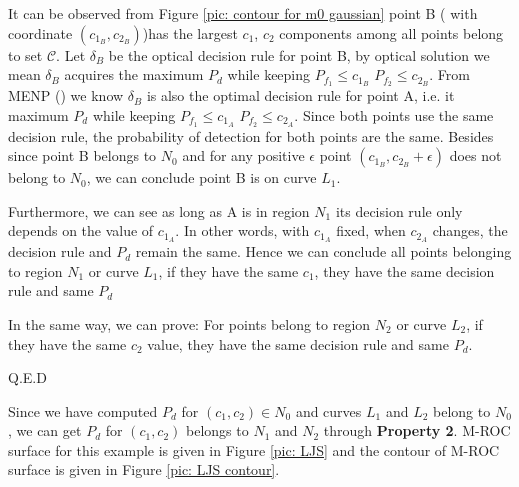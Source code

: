 It can be observed from Figure \ref{pic: contour for m0 gaussian} point B ( with coordinate $(c_{1_B}, c_{2_B})$)has the largest $c_1$, $c_2$ components among all points belong to set $\mathcal{C}$. 
Let $\delta_B$ be the optical decision rule for point B, by optical solution we mean $\delta_B$ acquires the maximum $P_d$ while keeping $P_{f_1} \leq c_{1_B}$ $P_{f_2} \leq c_{2_B}$.
From MENP () we know  $\delta_B$ is also the optimal decision rule for point A, i.e. it maximum $P_d$ while keeping $P_{f_1} \leq c_{1_A}$ $P_{f_2} \leq c_{2_A}$. Since both points use the same decision rule, the probability of detection for both points are the same. Besides since point B belongs to $N_0$ and for any positive $\epsilon$ point $(c_{1_B}, c_{2_B} + \epsilon)$ does not belong to $N_0$, we can conclude point B is on curve $L_1$. 

Furthermore, we can see as long as A is in region $N_1$ its decision rule only depends on the value of $c_{1_A}$.  In other words, with $c_{1_A}$ fixed,  when $c_{2_A}$ changes, the decision rule and $P_d$ remain the same. Hence we can conclude all points belonging to region $N_1$ or curve $L_1$, if they have the same $c_1$, they have the same decision rule and same $P_d$

In the same way, we can prove: For points belong to region $N_2$ or curve $L_2$, if they have the same $c_2$ value, they have the same decision rule and same $P_d$.

Q.E.D

Since we have computed $P_d$ for $(c_1, c_2) \in N_0$ and curves $L_1$ and $L_2$ belong to $N_0$, we can get $P_d$ for $(c_1, c_2)$ belongs to $N_1$ and $N_2$ through \textbf{Property 2}. M-ROC surface for this example is given in Figure  \ref{pic: LJS} and the contour of M-ROC surface is given in Figure \ref{pic: LJS contour}.

